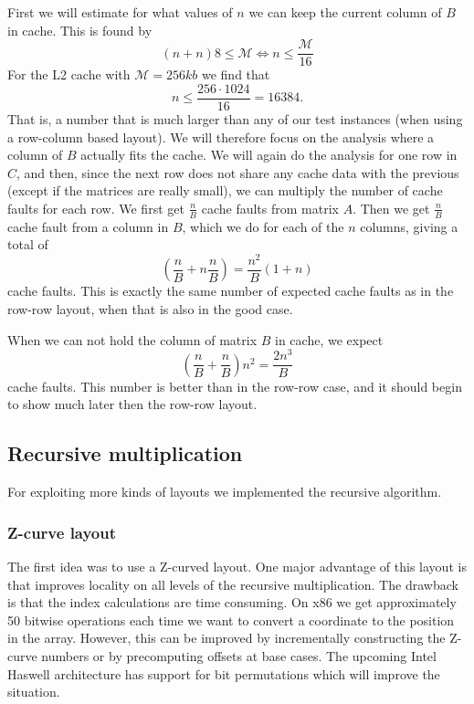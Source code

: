 First we will estimate for what values of $n$ we can keep the current
column of $B$ in cache. This is found by
\[
(n + n)8 \leq \mathcal{M} \iff n \leq \frac{\mathcal{M}}{16}
\]
For the L2 cache with $\mathcal{M} = 256kb$ we find that
\[
n \leq \frac{256 \cdot 1024}{16} = 16384.
\]
That is, a number that is much larger than any of our test instances
(when using a row-column based layout). We will therefore focus on the
analysis where a column of $B$ actually fits the cache. We will again
do the analysis for one row in $C$, and then, since the next row does
not share any cache data with the previous (except if the matrices are
really small), we can multiply the number of cache faults for each
row. We first get $\frac{n}{B}$ cache faults from matrix $A$. Then we
get $\frac{n}{B}$ cache fault from a column in $B$, which we do for
each of the $n$ columns, giving a total of
\[
\left( \frac{n}{B} + n \frac{n}{B} \right) = \frac{n^2}{B}\left(1 + n \right)
\]
cache faults. This is exactly the same number of expected cache faults
as in the row-row layout, when that is also in the good case.

When we can not hold the column of matrix $B$ in cache, we expect
\[
\left( \frac{n}{B} + \frac{n}{B} \right) n^2 = \frac{2n^3}{B}
\]
cache faults. This number is better than in the row-row case, and it
should begin to show much later then the row-row layout.

\subsection{Recursive multiplication}

For exploiting more kinds of layouts we implemented the recursive algorithm.

\subsubsection{Z-curve layout}

The first idea was to use a Z-curved layout. One major advantage of this layout is that improves locality on all levels of the recursive multiplication. The drawback is that the index calculations are time consuming. On x86 we get approximately 50 bitwise operations each time we want to convert a coordinate to the position in the array. However, this can be improved by incrementally constructing the Z-curve numbers or by precomputing offsets at base cases. The upcoming Intel Haswell architecture has support for bit permutations which will improve the situation.

